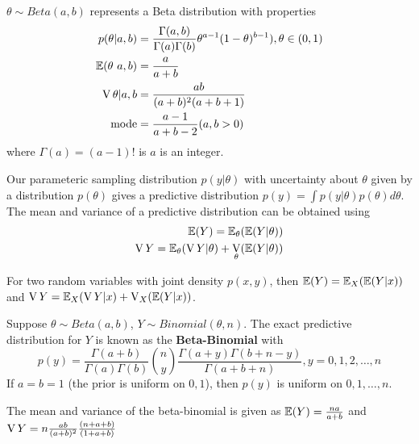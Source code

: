 \begin{defn}
  \label{sec:prob-bayes-theor-4}
  $\theta \sim Beta(a, b)$ represents a Beta distribution with
  properties
  \begin{align}
    p(\theta | a, b) &= \frac{\Gamma(a, b)}{\Gamma(a) \Gamma(b)} \theta^{a-1} (1 - \theta)^{b-1}), \theta \in (0, 1) \\
    \E{\theta \ a, b} &= \frac{a}{a+b} \\
    \V{\theta | a, b} &= \frac{ab}{(a+b)^{2}(a+b+1)} \\
    \text{mode} &= \frac{a-1}{a+b - 2}  (a, b > 0) \\
  \end{align}
  where $\Gamma(a) = (a-1)!$ is $a$ is an integer.
\end{defn}

\begin{thm}
  \label{sec:prob-bayes-theor-5}
  Our parameteric sampling distribution $p(y | \theta)$ with
  uncertainty about $\theta$ given by a distribution $p(\theta)$ gives
  a predictive distribution $p(y) = \int p(y| \theta) p(\theta)
  d\theta$. 
  The mean and variance of a predictive distribution can be obtained
  using
  \begin{align}
    \label{eq:4}
    \E{Y} = \E_{\theta}(\E{Y | \theta}) \\
    \V{Y} = \E_{\theta}(\V{Y | \theta}) + \V_{\theta}(\E{Y | \theta})
  \end{align}
\end{thm}

\begin{thm}
  \label{sec:prob-bayes-theor-6}
  For two random variables with joint density $p(x, y)$, then $\E{Y} =
  \E_{X}(\E{Y | x})$ and $\V{Y} = \E_{X}(\V{Y | x}) + \V_{X}(\E{Y|x})$.
\end{thm}

\begin{defn}
  \label{sec:prob-bayes-theor-7}
  Suppose $\theta \sim Beta(a, b)$, $Y \sim Binomial(\theta, n)$.  The
  exact predictive distribution for $Y$ is known as the
  \textbf{Beta-Binomial} with
  \begin{equation}
    \label{eq:5}
    p(y) = \frac{\Gamma(a+b)}{\Gamma(a) \Gamma(b)}  {n \choose y}
    \frac{\Gamma(a+y) \Gamma(b + n - y)}{\Gamma(a + b + n)}, y = 0,1,2,\dots,n
  \end{equation}
  If $a = b = 1$ (the prior is uniform on $0, 1$), then $p(y)$ is
  uniform on $0, 1, \dots, n$.

  The mean and variance of the beta-binomial is given as $\E{Y} =
  \frac{na}{a+b}$ and $\operatorname*{V}{Y} = n \frac{ab}{(a+b)^{2}} \frac{(n+a+b)}{(1+a+b)}$
\end{defn}

